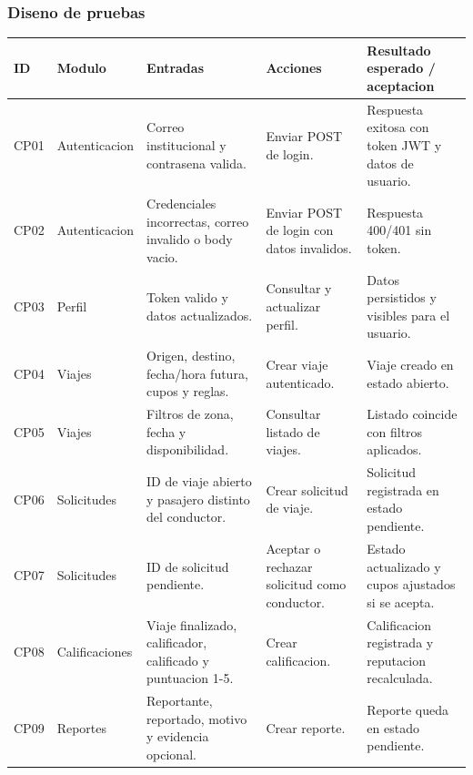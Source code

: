 \documentclass{article}
\begin{document}
\subsubsection{Diseno de pruebas}
\begin{longtable}{p{1.2cm} p{2.2cm} p{3.2cm} p{3.8cm} p{4.0cm}}
    \toprule
    \textbf{ID} & \textbf{Modulo} & \textbf{Entradas}                                           & \textbf{Acciones}                            & \textbf{Resultado esperado / aceptacion}            \\
    \midrule
    CP01        & Autenticacion   & Correo institucional y contrasena valida.                   & Enviar POST de login.                        & Respuesta exitosa con token JWT y datos de usuario. \\
    CP02        & Autenticacion   & Credenciales incorrectas, correo invalido o body vacio.     & Enviar POST de login con datos invalidos.    & Respuesta 400/401 sin token.                        \\
    CP03        & Perfil          & Token valido y datos actualizados.                          & Consultar y actualizar perfil.               & Datos persistidos y visibles para el usuario.       \\
    CP04        & Viajes          & Origen, destino, fecha/hora futura, cupos y reglas.         & Crear viaje autenticado.                     & Viaje creado en estado abierto.                     \\
    CP05        & Viajes          & Filtros de zona, fecha y disponibilidad.                    & Consultar listado de viajes.                 & Listado coincide con filtros aplicados.             \\
    CP06        & Solicitudes     & ID de viaje abierto y pasajero distinto del conductor.      & Crear solicitud de viaje.                    & Solicitud registrada en estado pendiente.           \\
    CP07        & Solicitudes     & ID de solicitud pendiente.                                  & Aceptar o rechazar solicitud como conductor. & Estado actualizado y cupos ajustados si se acepta.  \\
    CP08        & Calificaciones  & Viaje finalizado, calificador, calificado y puntuacion 1-5. & Crear calificacion.                          & Calificacion registrada y reputacion recalculada.   \\
    CP09        & Reportes        & Reportante, reportado, motivo y evidencia opcional.         & Crear reporte.                               & Reporte queda en estado pendiente.                  \\

\end{longtable}
\end{document}
